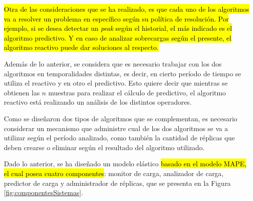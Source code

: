 
\hl{Otra de las consideraciones que se ha realizado, es que cada uno de los algoritmos va a resolver un problema en específico según su política de resolución. Por ejemplo, si se desea detectar un \textit{peak} según el historial, el más indicado es el algoritmo predictivo. Y en caso de analizar sobrecargas según el presente, el algoritmo reactivo puede dar soluciones al respecto.}

Además de lo anterior, se considera que es necesario trabajar con los dos algoritmos en temporalidades distintas, es decir, en cierto período de tiempo se utiliza el reactivo y en otro el predictivo. Esto quiere decir que mientras se obtienen las $n$ muestras para realizar el cálculo de predictivo, el algoritmo reactivo está realizando un análisis de los distintos operadores.


Como se diseñaron dos tipos de algoritmos que se complementan, es necesario considerar un mecanismo que administre cual de los dos algoritmos se va a utilizar según el período analizado, como también la cantidad de réplicas que deben crearse o eliminar según el resultado del algoritmo utilizado.

Dado lo anterior, se ha diseñado un modelo elástico \hl{basado en el modelo MAPE}\citep{jacob2004practical}\hl{, el cual posea cuatro componentes}: monitor de carga, analizador de carga, predictor de carga y administrador de réplicas, que se presenta en la Figura \ref{fig:componentesSistemas}.

